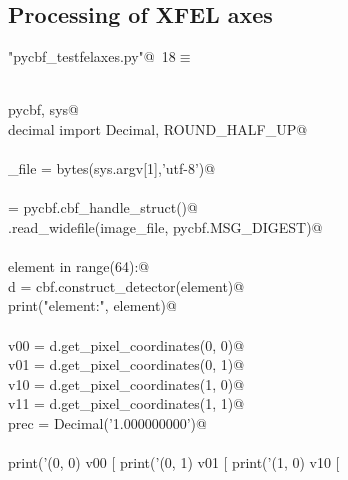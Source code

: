 \documentclass[10pt,a4paper,twoside,notitlepage]{article}
\begin{document}
\subsection{Processing of XFEL axes}

\begin{flushleft} \small
\begin{minipage}{\linewidth}\label{scrap17}\raggedright\small
{} \verb@"pycbf_testfelaxes.py"@\nobreak\ {\footnotesize {18}}$\equiv$
\vspace{-1ex}
\begin{list}{}{} \item
\mbox{}\verb@@\\
\mbox{}\verb@import pycbf, sys@\\
\mbox{}\verb@from decimal import Decimal, ROUND_HALF_UP@\\
\mbox{}\verb@@\\
\mbox{}\verb@image_file = bytes(sys.argv[1],'utf-8')@\\
\mbox{}\verb@@\\
\mbox{}\verb@cbf = pycbf.cbf_handle_struct()@\\
\mbox{}\verb@cbf.read_widefile(image_file, pycbf.MSG_DIGEST)@\\
\mbox{}\verb@@\\
\mbox{}\verb@for element in range(64):@\\
\mbox{}\verb@    d = cbf.construct_detector(element)@\\
\mbox{}\verb@    print("element:", element)@\\
\mbox{}\verb@@\\
\mbox{}\verb@    v00 = d.get_pixel_coordinates(0, 0)@\\
\mbox{}\verb@    v01 = d.get_pixel_coordinates(0, 1)@\\
\mbox{}\verb@    v10 = d.get_pixel_coordinates(1, 0)@\\
\mbox{}\verb@    v11 = d.get_pixel_coordinates(1, 1)@\\
\mbox{}\verb@    prec = Decimal('1.000000000')@\\
\mbox{}\verb@@\\
\mbox{}\verb@    print('(0, 0) v00 [ %.9f %.9f %.9f ]' %(round(v00[0],9), round(v00[1],9), round(v00[2],9)))@\\
\mbox{}\verb@    print('(0, 1) v01 [ %.9g %.9g %.9g ]' %(round(v01[0],9), round(v01[1],9), round(v01[2],9)))@\\
\mbox{}\verb@    print('(1, 0) v10 [ %.9g %.9g %.9g ]' %(round(v10[0],9), round(v10[1],9), round(v10[2],9)))@\\

\end{list}
\end{minipage}
\end{flushleft}
\end{document}
